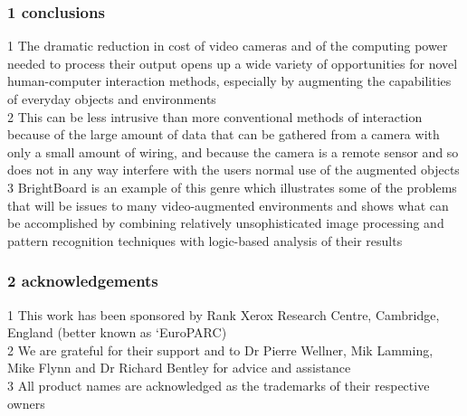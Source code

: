 \documentclass{beamer}
\begin{document}
\begin{frame}
\frametitle{1 conclusions}
1  The dramatic reduction in cost of video cameras and of the computing power needed to process their output opens up a wide variety of opportunities for novel human-computer interaction methods, especially by augmenting the capabilities of everyday objects and environments \\2  This can be less intrusive than more conventional methods of interaction because of the large amount of data that can be gathered from a camera with only a small amount of wiring, and because the camera is a remote sensor and so does not in any way interfere with the users normal use of the augmented objects \\3      BrightBoard is an example of this genre which illustrates some of the problems that will be issues to many video-augmented environments and shows what can be accomplished by combining relatively unsophisticated image processing and pattern recognition techniques with logic-based analysis of their results \\
\end{frame}
\begin{frame}
\frametitle{2 acknowledgements}
1  This work has been sponsored by Rank Xerox Research Centre, Cambridge, England (better known as `EuroPARC) \\2  We are grateful for their support and to Dr Pierre Wellner, Mik Lamming, Mike Flynn and Dr Richard Bentley for advice and assistance \\3      All product names are acknowledged as the trademarks of their respective owners \\
\end{frame}
\end{document}
